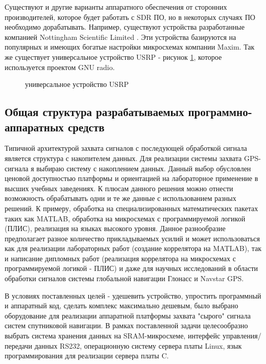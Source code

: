 Существуют и другие варианты аппаратного обеспечения от сторонних
производителей, которое будет работать с SDR ПО, но в некоторых случаях ПО необходимо дорабатывать. Например, существуют устройства
разработанные компанией Nottingham Scientific Limited \cite{soft_gps1}. Эти устройства базируются на популярных и
имеющих богатые настройки микросхемах компании Maxim. Так же существует универсальное устройство USRP - рисунок \ref{pic:usrp},
которое используется проектом GNU radio.

\begin{figure}[H]
\begin{center}
\end{center}
\caption{универсальное устройство USRP}
\label{pic:usrp}
\end{figure}

\subsection{Общая структура разрабатываемых программно-аппаратных средств}
\label{razdel13}
Типичной архитектурой захвата сигналов с последующей обработкой сигнала является структура с накопителем данных.
Для реализации системы захвата GPS-сигнала я выбираю систему с накоплением данных. Данный выбор обусловлен
ценовой доступностью платформы и ориентацией на лабораторное применение в высших учебных заведениях.
К плюсам данного решения можно отнести возможность обрабатывать одни и те же данные с использованием разных решений.
К примеру, обработка на специализированных математических пакетах таких как MATLAB, обработка на микросхемах с
программируемой логикой (ПЛИС), реализация на языках высокого уровня. Данное разнообразие предполагает разное
количество прикладываемых усилий и может использоваться как для реализации лабораторных работ (создание
коррелятора на MATLAB), так и написание дипломных работ (реализация коррелятора на микросхемах с программируемой
логикой - ПЛИС) и даже для научных исследований в области обработки сигналов системы глобальной навигации
Глонасс и Navstar GPS.

В условиях поставленных целей - удешевить устройство, упростить программный и аппаратный код, сделать
комплекс максимально дешевым, было выбрано оборудование для реализации аппаратной платформы захвата "сырого"
сигнала систем спутниковой навигации. В рамках поставленной задачи целесообразно выбрать система хранения данных
на SRAM-микросхеме, интерфейс управления/передачи данных RS232, операционную систему
сервера платы Linux, язык программирования для реализации сервера платы C.

